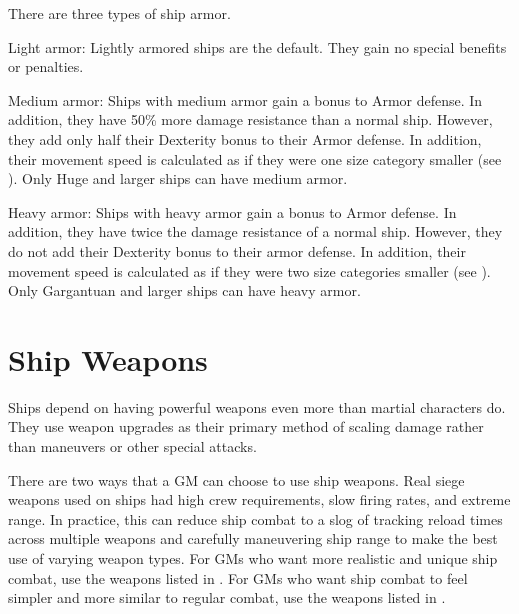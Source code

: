     There are three types of ship armor.
    \begin{raggeditemize}
        \item Light armor: Lightly armored ships are the default. They gain no special benefits or penalties.
        \item Medium armor: Ships with medium armor gain a  bonus to Armor defense.
            In addition, they have 50\% more damage resistance than a normal ship.
            However, they add only half their Dexterity bonus to their Armor defense.
            In addition, their movement speed is calculated as if they were one size category smaller (see ).
            Only Huge and larger ships can have medium armor.
        \item Heavy armor: Ships with heavy armor gain a  bonus to Armor defense.
            In addition, they have twice the damage resistance of a normal ship.
            However, they do not add their Dexterity bonus to their armor defense.
            In addition, their movement speed is calculated as if they were two size categories smaller (see ).
            Only Gargantuan and larger ships can have heavy armor.
    \end{raggeditemize}


\section{Ship Weapons}\label{Ship Weapons}
    Ships depend on having powerful weapons even more than martial characters do.
    They use weapon upgrades as their primary method of scaling damage rather than maneuvers or other special attacks.

    There are two ways that a GM can choose to use ship weapons.
    Real siege weapons used on ships had high crew requirements, slow firing rates, and extreme range.
    In practice, this can reduce ship combat to a slog of tracking reload times across multiple weapons and carefully maneuvering ship range to make the best use of varying weapon types.
    For GMs who want more realistic and unique ship combat, use the weapons listed in .
    For GMs who want ship combat to feel simpler and more similar to regular combat, use the weapons listed in .

